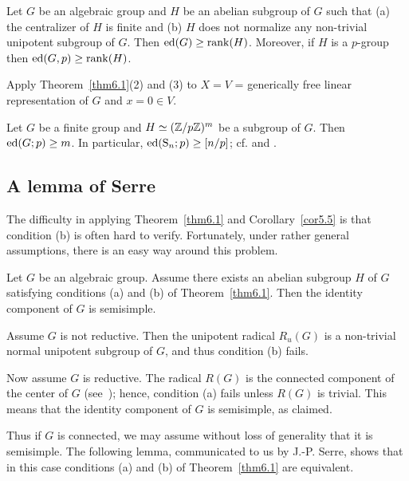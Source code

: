 \begin{cor} \label{cor5.5}
Let $G$ be an algebraic group and $H$ be an abelian subgroup 
of $G$ such that
(a) the centralizer of $H$ is finite and (b) $H$ does not normalize
any non-trivial unipotent subgroup of $G$.
Then $\operatorname{ed}(G) \geq \operatorname{rank}(H)$. Moreover, if $H$ is a $p$-group
then $\operatorname{ed}(G, p) \geq \operatorname{rank}(H)$. 
\end{cor}

\begin{pf} Apply Theorem~\ref{thm6.1}(2) and (3)
to $X = V$ = generically free 
linear representation of $G$ and $x = 0 \in V$.
\end{pf}

\begin{example} Let $G$ be a finite group and $H \simeq ({\Bbb Z}/p{\Bbb Z})^m$
be a subgroup of $G$. Then $\operatorname{ed}(G; p) \geq m$. In particular, $\operatorname{ed}({\operatorname{S}}_n; p)
\geq [n/p]$; cf. \cite[Section~6.1]{br1} and \cite[Section~7]{br2}.
\end{example}

\subsection*{A lemma of Serre}

The difficulty in applying Theorem~\ref{thm6.1} 
and Corollary~\ref{cor5.5} is that
condition (b) is often hard to verify. Fortunately,
under rather general assumptions, there is an easy way around 
this problem.

\begin{remark} Let $G$ be an algebraic group. Assume there exists
an abelian subgroup $H$ of $G$ satisfying 
conditions (a) and (b) of Theorem~\ref{thm6.1}. Then the identity 
component of $G$ is semisimple.
\end{remark}

\begin{pf} Assume $G$ is not reductive. Then the unipotent 
radical $R_u(G)$ is a non-trivial normal unipotent subgroup
of $G$, and thus condition (b) fails.  

Now assume 
$G$ is reductive. The radical $R(G)$ is the connected component 
of the center of $G$ (see~\cite[19.5]{humphreys}); hence, condition (a)
fails unless $R(G)$ is trivial. This means that the identity component 
of $G$ is semisimple, as claimed.
\end{pf} 

Thus if $G$ is connected, we may assume without loss of generality
that it is semisimple. The following lemma, communicated to us by
J.-P. Serre, shows that in this case conditions (a) and (b) of
Theorem~\ref{thm6.1} are equivalent.

